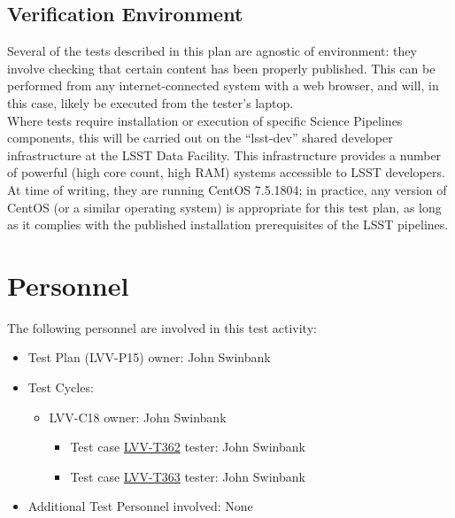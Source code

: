 \documentclass[DM,STR,toc]{lsstdoc}
\begin{document}
\subsection{Verification Environment}
\label{sect:hwconf}
  Several of the tests described in this plan are agnostic of environment:
they involve checking that certain content has been properly published.
This can be performed from any internet-connected system with a web
browser, and will, in this case, likely be executed from the tester's
laptop.\\[2\baselineskip]Where tests require installation or execution
of specific Science Pipelines components, this will be carried out on
the ``lsst-dev'' shared developer infrastructure at the LSST Data
Facility. This infrastructure provides a number of powerful (high core
count, high RAM) systems accessible to LSST developers. At time of
writing, they are running CentOS 7.5.1804; in practice, any version of
CentOS (or a similar operating system) is appropriate for this test
plan, as long as it complies with the published installation
prerequisites of the LSST pipelines.\\[2\baselineskip]





\section{Personnel}
\label{sect:personnel}

The following personnel are involved in this test activity:

\begin{itemize}
\item Test Plan (LVV-P15) owner: John Swinbank
\item Test Cycles:
\begin{itemize}
  \item LVV-C18 owner: 
    John Swinbank
  \begin{itemize}
    \item Test case \href{https://jira.lsstcorp.org/secure/Tests.jspa#/testCase/LVV-T362}{LVV-T362} tester: John Swinbank
    \item Test case \href{https://jira.lsstcorp.org/secure/Tests.jspa#/testCase/LVV-T363}{LVV-T363} tester: John Swinbank
  \end{itemize}
\end{itemize}
\item Additional Test Personnel involved: None
\end{itemize}
\end{document}
